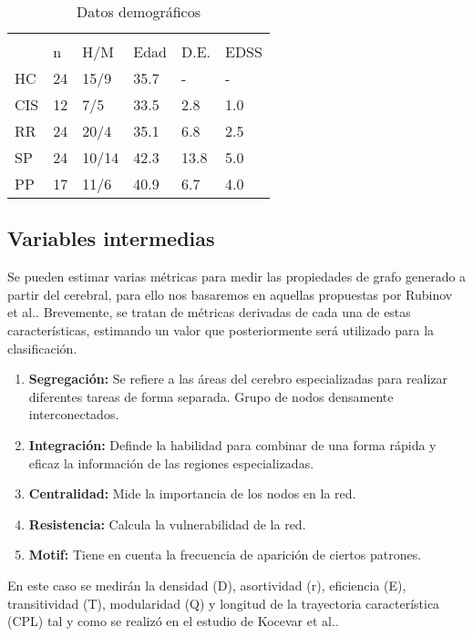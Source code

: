 \documentclass[fleqn,10pt]{UICArticle} %
\begin{document}
\begin{table}[hbt]
\caption{Datos demográficos}
\centering
\begin{tabular}{llllll}
\toprule
\multicolumn{6}{l}{} \\
     & n   & H/M    & Edad  & D.E.  & EDSS  \\
HC   & 24  & 15/9   & 35.7  & -     & -     \\
CIS  & 12  & 7/5    & 33.5  & 2.8   & 1.0   \\
RR   & 24  & 20/4   & 35.1  & 6.8   & 2.5   \\
SP   & 24  & 10/14  & 42.3  & 13.8  & 5.0   \\
PP   & 17  & 11/6   & 40.9  & 6.7   & 4.0   \\
\bottomrule
\end{tabular}
\label{tab:demographics}
\end{table}

\subsection{Variables intermedias}
Se pueden estimar varias métricas para medir las propiedades de grafo generado a partir del cerebral, para ello nos basaremos en aquellas propuestas por Rubinov et al.\cite{Rubinov2010}. Brevemente, se tratan de métricas derivadas de cada una de estas características, estimando un valor que posteriormente será utilizado para la clasificación.

\begin{enumerate}[noitemsep]
\item \textbf{Segregación:} Se refiere a las áreas del cerebro especializadas para realizar diferentes tareas de forma separada. Grupo de nodos densamente interconectados.
\item \textbf{Integración:} Definde la habilidad para combinar de una forma rápida y eficaz la información de las regiones especializadas.
\item \textbf{Centralidad:} Mide la importancia de los nodos en la red.
\item \textbf{Resistencia:} Calcula la vulnerabilidad de la red.
\item \textbf{Motif:} Tiene en cuenta la frecuencia de aparición de ciertos patrones.
\end{enumerate}

En este caso se medirán la densidad (D), asortividad (r), eficiencia (E), transitividad (T), modularidad (Q) y longitud de la trayectoria característica (CPL) tal y como se realizó en el estudio de Kocevar et al.\cite{Kocevar2016}.
\end{document}
